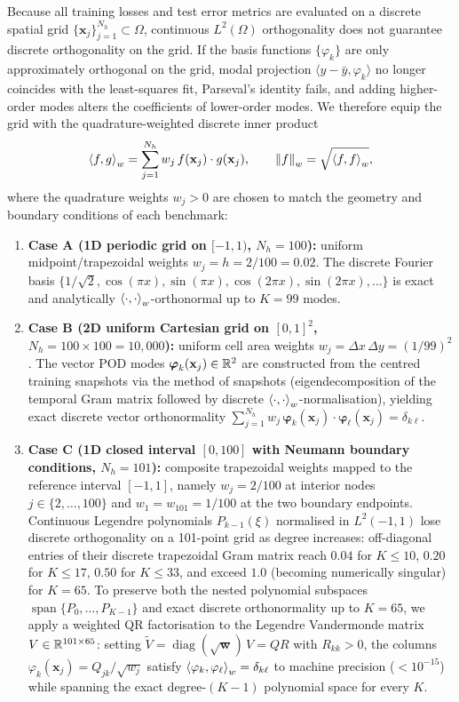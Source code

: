 Because all training losses and test error metrics are evaluated on a discrete spatial grid $\{\mathbf{x}_j\}_{j=1}^{N_h} \subset \Omega$, continuous $L^2(\Omega)$ orthogonality does not guarantee discrete orthogonality on the grid. If the basis functions $\{\varphi_k\}$ are only approximately orthogonal on the grid, modal projection $\langle y - \bar{y}, \varphi_k \rangle$ no longer coincides with the least-squares fit, Parseval's identity fails, and adding higher-order modes alters the coefficients of lower-order modes. We therefore equip the grid with the quadrature-weighted discrete inner product
\begin{equation}
  \left\langle f, g \right\rangle_w = \sum_{j=1}^{N_h} w_j\, f(\mathbf{x}_j) \cdot g(\mathbf{x}_j), \qquad \left\lVert f \right\rVert_w = \sqrt{\left\langle f, f \right\rangle_w},
  \label{eq:discrete_ip}
\end{equation}
where the quadrature weights $w_j > 0$ are chosen to match the geometry and boundary conditions of each benchmark:
\begin{enumerate}[leftmargin=2em]
  \item \textbf{Case A (1D periodic grid on $[-1,1)$, $N_h = 100$):} uniform midpoint/trapezoidal weights $w_j = h = 2/100 = 0.02$. The discrete Fourier basis $\{1/\sqrt{2}, \cos(\pi x), \sin(\pi x), \cos(2\pi x), \sin(2\pi x), \dots\}$ is exact and analytically $\left\langle \cdot, \cdot \right\rangle_w$-orthonormal up to $K = 99$ modes.
  \item \textbf{Case B (2D uniform Cartesian grid on $[0,1]^2$, $N_h = 100 \times 100 = 10{,}000$):} uniform cell area weights $w_j = \Delta x\,\Delta y = (1/99)^2$. The vector POD modes $\boldsymbol{\varphi}_k(\mathbf{x}_j) \in \mathbb{R}^2$ are constructed from the centred training snapshots via the method of snapshots (eigendecomposition of the temporal Gram matrix followed by discrete $\left\langle \cdot, \cdot \right\rangle_w$-normalisation), yielding exact discrete vector orthonormality $\sum_{j=1}^{N_h} w_j\,\boldsymbol{\varphi}_k(\mathbf{x}_j)\cdot\boldsymbol{\varphi}_\ell(\mathbf{x}_j) = \delta_{k\ell}$.
  \item \textbf{Case C (1D closed interval $[0,100]$ with Neumann boundary conditions, $N_h = 101$):} composite trapezoidal weights mapped to the reference interval $[-1,1]$, namely $w_j = 2/100$ at interior nodes $j \in \{2,\dots,100\}$ and $w_1 = w_{101} = 1/100$ at the two boundary endpoints. Continuous Legendre polynomials $P_{k-1}(\xi)$ normalised in $L^2(-1,1)$ lose discrete orthogonality on a 101-point grid as degree increases: off-diagonal entries of their discrete trapezoidal Gram matrix reach $0.04$ for $K \le 10$, $0.20$ for $K \le 17$, $0.50$ for $K \le 33$, and exceed $1.0$ (becoming numerically singular) for $K = 65$. To preserve both the nested polynomial subspaces $\operatorname{span}\{P_0,\dots,P_{K-1}\}$ and exact discrete orthonormality up to $K=65$, we apply a weighted QR factorisation to the Legendre Vandermonde matrix $V \in \mathbb{R}^{101 \times 65}$: setting $\widetilde{V} = \operatorname{diag}(\sqrt{\mathbf{w}})\,V = Q R$ with $R_{kk} > 0$, the columns $\varphi_k(\mathbf{x}_j) = Q_{jk}/\sqrt{w_j}$ satisfy $\left\langle \varphi_k, \varphi_\ell \right\rangle_w = \delta_{k\ell}$ to machine precision ($< 10^{-15}$) while spanning the exact degree-$(K-1)$ polynomial space for every $K$.
\end{enumerate}

